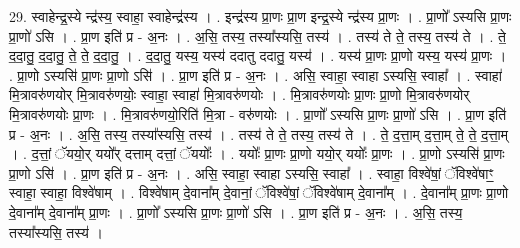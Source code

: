 \documentclass[17pt]{extarticle}
\begin{document}
29. स्वाहेन्द्र॒स्ये न्द्र॑स्य॒ स्वाहा॒ स्वाहेन्द्र॑स्य । . इन्द्र॑स्य प्रा॒णः प्रा॒ण इन्द्र॒स्ये न्द्र॑स्य प्रा॒णः । . प्रा॒णो᳚ ऽस्यसि प्रा॒णः प्रा॒णो॑ ऽसि । . प्रा॒ण इति॑ प्र - अ॒नः । . अ॒सि॒ तस्य॒ तस्या᳚स्यसि॒ तस्य॑ । . तस्य॑ ते ते॒ तस्य॒ तस्य॑ ते । . ते॒ द॒दा॒तु॒ द॒दा॒तु॒ ते॒ ते॒ द॒दा॒तु॒ । . द॒दा॒तु॒ यस्य॒ यस्य॑ ददातु ददातु॒ यस्य॑ । . यस्य॑ प्रा॒णः प्रा॒णो यस्य॒ यस्य॑ प्रा॒णः । . प्रा॒णो ऽस्यसि॑ प्रा॒णः प्रा॒णो ऽसि॑ । . प्रा॒ण इति॑ प्र - अ॒नः । . असि॒ स्वाहा॒ स्वाहा ऽस्यसि॒ स्वाहा᳚ । . स्वाहा॑ मि॒त्रावरु॑णयोर् मि॒त्रावरु॑णयोः॒ स्वाहा॒ स्वाहा॑ मि॒त्रावरु॑णयोः । . मि॒त्रावरु॑णयोः प्रा॒णः प्रा॒णो मि॒त्रावरु॑णयोर् मि॒त्रावरु॑णयोः प्रा॒णः । . मि॒त्रावरु॑णयो॒रिति॑ मि॒त्रा - वरु॑णयोः । . प्रा॒णो᳚ ऽस्यसि प्रा॒णः प्रा॒णो॑ ऽसि । . प्रा॒ण इति॑ प्र - अ॒नः । . अ॒सि॒ तस्य॒ तस्या᳚स्यसि॒ तस्य॑ । . तस्य॑ ते ते॒ तस्य॒ तस्य॑ ते । . ते॒ द॒त्ता॒म् द॒त्ता॒म् ते॒ ते॒ द॒त्ता॒म् । . द॒त्तां॒ ॅययो॒र् ययो᳚र् दत्ताम् दत्तां॒ ॅययोः᳚ । . ययोः᳚ प्रा॒णः प्रा॒णो ययो॒र् ययोः᳚ प्रा॒णः । . प्रा॒णो ऽस्यसि॑ प्रा॒णः प्रा॒णो ऽसि॑ । . प्रा॒ण इति॑ प्र - अ॒नः । . असि॒ स्वाहा॒ स्वाहा ऽस्यसि॒ स्वाहा᳚ । . स्वाहा॒ विश्वे॑षां॒ ॅविश्वे॑षाꣳ॒॒ स्वाहा॒ स्वाहा॒ विश्वे॑षाम् । . विश्वे॑षाम् दे॒वाना᳚म् दे॒वानां॒ ॅविश्वे॑षां॒ ॅविश्वे॑षाम् दे॒वाना᳚म् । . दे॒वाना᳚म् प्रा॒णः प्रा॒णो दे॒वाना᳚म् दे॒वाना᳚म् प्रा॒णः । . प्रा॒णो᳚ ऽस्यसि प्रा॒णः प्रा॒णो॑ ऽसि । . प्रा॒ण इति॑ प्र - अ॒नः । . अ॒सि॒ तस्य॒ तस्या᳚स्यसि॒ तस्य॑ । \newline
\end{document}

